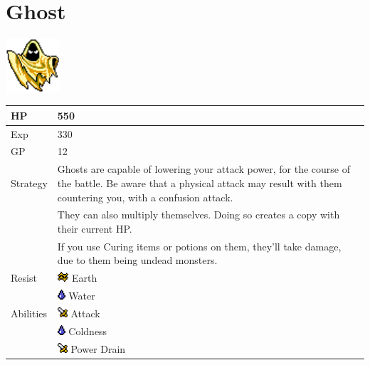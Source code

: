 \section{Ghost}
\label{monster:ghost}

\includegraphics[height=2cm,keepaspectratio]{./resources/monster/ghost}

\begin{longtable}{ l p{9cm} }
	HP
	& 550
\\ \hline
	Exp
	& 330
\\ \hline
	GP
	& 12
\\ \hline
	Strategy
	& Ghosts are capable of lowering your attack power, for the course of the battle. Be aware that a physical attack may result with them countering you, with a confusion attack. \\
	& They can also multiply themselves. Doing so creates a copy with their current HP. \\
	& If you use Curing items or potions on them, they'll take damage, due to them being undead monsters.
\\ \hline
	Resist
	& \includegraphics[height=1em,keepaspectratio]{./resources/effects/earth} Earth \\
	& \includegraphics[height=1em,keepaspectratio]{./resources/effects/water} Water
\\ \hline
	Abilities
	& \includegraphics[height=1em,keepaspectratio]{./resources/effects/damage} Attack \\
	& \includegraphics[height=1em,keepaspectratio]{./resources/effects/water} Coldness \\
	& \includegraphics[height=1em,keepaspectratio]{./resources/effects/damage} Power Drain
\end{longtable}
